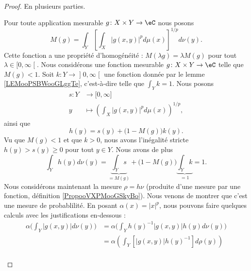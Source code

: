 \begin{proof}
	En plusieurs parties.
	\begin{subproof}
		\spitem[La fonction \( M\)]
		Pour toute application mesurable \( g\colon X\times Y\to \eC\) nous posons
		\begin{equation}
			M(g)=\int_Y \left[ \int_X| g(x,y) |^pd\mu(x) \right]^{1/p}d\nu(y).
		\end{equation}
		Cette fonction a une propriété d'homogénéité : \( M(\lambda g)=\lambda M(g)\) pour tout \( \lambda\in \mathopen[ 0 , \infty \mathclose[\).
			\spitem[Si \(  M(g)<1 \)]
			Nous considérons une fonction mesurable \( g\colon X\times Y\to \eC\) telle que \( M(g)<1\). Soit \( k\colon Y\to \mathopen] 0 , \infty \mathclose[\) une fonction donnée par le lemme \ref{LEMooPSBWooGLggTe}, c'est-à-dire telle que \( \int_Yk=1\). Nous posons
		\begin{equation}
			\begin{aligned}
				s\colon Y & \to \mathopen[ 0 , \infty \mathclose]                   \\
				y         & \mapsto \left( \int_X| g(x,y) |^pd\mu(x) \right)^{1/p},
			\end{aligned}
		\end{equation}
		ainsi que
		\begin{equation}
			h(y)=s(y)+\big(1-M(g)\big)k(y).
		\end{equation}
		Vu que \( M(g)<1\) et que \( k>0\), nous avons l'inégalité stricte \( h(y)>s(y)\geq 0\) pour tout \( y\in Y\). Nous avons de plus
		\begin{equation}
			\int_Y h(y)d\nu(y)=\underbrace{\int_Ys}_{=M(g)}+\big( 1-M(g) \big)\underbrace{\int_Yk}_{=1}=1.
		\end{equation}
		Nous considérons maintenant la mesure \( \rho=h\nu\) (produite d'une mesure par une fonction, définition \ref{PropooVXPMooGSkyBo}). Nous venons de montrer que c'est une mesure de probablilité. En posant \( \alpha(x)=| x |^p\), nous pouvons faire quelques calculs avec les justifications en-dessous :
		\begin{subequations}        \label{SUBEQSooPPZIooSEDcpS}
			\begin{align}
				\alpha\big( \int_Y|g(x,y)|d\nu(y)\big) & =\alpha\big( \int_Yh(y)^{-1}|g(x,y)|h(y)d\nu(y)\big)                                     \\
				                                       & =\alpha\left( \int_Y [|g(x,y)|h(y)^{-1}]d\rho(y) \right)                                 \\

\end{align}
\end{subequations}
\end{subproof}
\end{proof}
